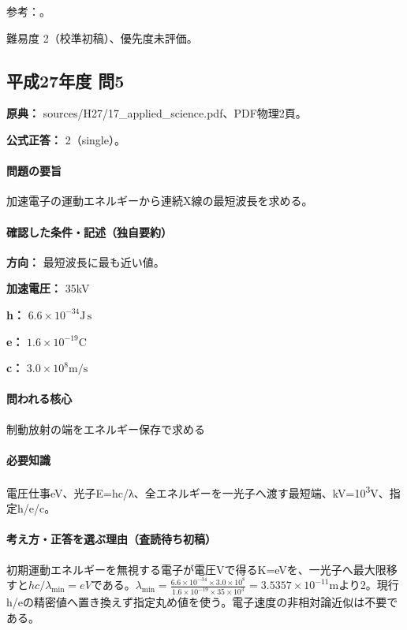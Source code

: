 \par 参考：\cite{os_matter}。

\par 難易度 2（校準初稿）、優先度未評価。

\subsection{平成27年度 問5}
\label{q:h27-reg-applied-05}

\noindent\textbf{原典：} sources/H27/17\_applied\_science.pdf、PDF物理2頁。

\textbf{公式正答：} 2（single）。

\paragraph{問題の要旨} 加速電子の運動エネルギーから連続X線の最短波長を求める。

\paragraph{確認した条件・記述（独自要約）}\mbox{}\par

\noindent\textbf{方向：} 最短波長に最も近い値。\par

\noindent\textbf{加速電圧：} 35kV\par

\noindent\textbf{h：} \(6.6\times10^{-34}\mathrm{J\,s}\)\par

\noindent\textbf{e：} \(1.6\times10^{-19}\mathrm C\)\par

\noindent\textbf{c：} \(3.0\times10^8\mathrm{m/s}\)\par

\paragraph{問われる核心} 制動放射の端をエネルギー保存で求める

\paragraph{必要知識} 電圧仕事eV、光子E=\allowbreak{}hc/λ、全エネルギーを一光子へ渡す最短端、kV=\allowbreak{}10\textsuperscript{3}V、指定h/e/c。

\paragraph{考え方・正答を選ぶ理由（査読待ち初稿）} 初期運動エネルギーを無視する電子が電圧Vで得るK=\allowbreak{}eVを、一光子へ最大限移すと\(hc/\lambda_{\min}=eV\)である。\(\lambda_{\min}=\frac{6.6\times10^{-34}\times3.0\times10^8}{1.6\times10^{-19}\times35\times10^3}=3.5357\times10^{-11}\mathrm m\)より2。現行h/eの精密値へ置き換えず指定丸め値を使う。電子速度の非相対論近似は不要である。

